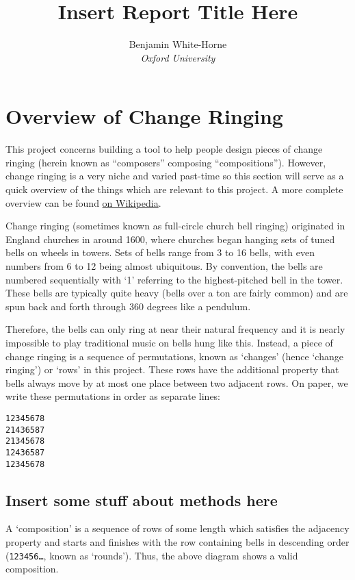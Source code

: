 \documentclass[12pt]{article}
\title{Insert Report Title Here}
\author{Benjamin White-Horne \\ \emph{Oxford University}}
\newcommand{\row}[1]{\texttt{#1}}
\newcommand{\br}[0]{\vspace{10pt} \noindent}
\begin{document}
\maketitle
\pagebreak
\tableofcontents
\pagebreak

\section{Overview of Change Ringing}

This project concerns building a tool to help people design pieces of change ringing (herein known
as ``composers'' composing ``compositions'').  However, change ringing is a very niche and varied
past-time so this section will serve as a quick overview of the things which are relevant to this
project.  A more complete overview can be found
\href{https://en.wikipedia.org/wiki/Change_ringing}{on Wikipedia}.

\br{}Change ringing (sometimes known as full-circle church bell ringing) originated in England
churches in around 1600, where churches began hanging sets of tuned bells on wheels in towers.
Sets of bells range from 3 to 16 bells, with even numbers from 6 to 12 being almost ubiquitous.
By convention, the bells are numbered sequentially with `1' referring to the highest-pitched bell in
the tower.  These bells are typically quite heavy (bells over a ton are fairly common) and are spun
back and forth through 360 degrees like a pendulum.

Therefore, the bells can only ring at near their natural frequency and it is nearly impossible to
play traditional music on bells hung like this.  Instead, a piece of change ringing is a sequence of
permutations, known as `changes' (hence `change ringing') or `rows' in this project.  These rows
have the additional property that bells always move by at most one place between two adjacent rows.
On paper, we write these permutations in order as separate lines:

\begin{verbatim}
12345678
21436587
21345678
12436587
12345678
\end{verbatim}

\subsection{Insert some stuff about methods here}

A `composition' is a sequence of rows of some length which satisfies the adjacency property and
starts and finishes with the row containing bells in descending order (\row{123456\ldots}, known as
`rounds').  Thus, the above diagram shows a valid composition.
\end{document}
